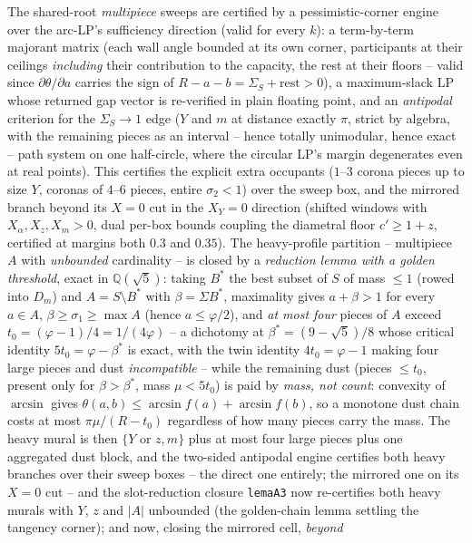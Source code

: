 \documentclass[11pt]{article}
\theoremstyle{definition}
\begin{document}
The shared-root \emph{multipiece} sweeps are certified by a
pessimistic-corner engine over the
arc-LP's sufficiency direction (valid for every $k$): a
term-by-term majorant matrix (each wall angle bounded at its own
corner, participants at their ceilings \emph{including} their
contribution to the capacity, the rest at their floors -- valid
since $\partial\theta/\partial a$ carries the sign of
$R-a-b=\Sigma_S+\text{rest}>0$), a maximum-slack LP whose returned
gap vector is re-verified in plain floating point, and an
\emph{antipodal} criterion for the $\Sigma_S\to1$ edge ($Y$ and $m$
at distance exactly $\pi$, strict by algebra, with the remaining
pieces as an interval -- hence totally unimodular, hence exact --
path system on one half-circle, where the circular LP's margin
degenerates even at real points). This certifies the explicit
extra occupants ($1$--$3$ corona pieces up to size $Y$, coronas of
$4$--$6$ pieces, entire $\sigma_2<1$) over the sweep box, and the
mirrored branch beyond its $X=0$ cut in the $X_Y=0$ direction
(shifted windows with $X_\alpha,X_z,X_m>0$, dual per-box bounds
coupling the diametral floor $c'\ge1+z$, certified at margins both
$0.3$ and $0.35$). The heavy-profile partition -- multipiece $A$
with \emph{unbounded} cardinality -- is closed by a
\emph{reduction lemma with a golden threshold}, exact in
$\mathbb{Q}(\sqrt5)$: taking $B^{*}$ the best subset of $S$ of mass
$\le1$ (rowed into $D_m$) and $A=S\setminus B^{*}$ with
$\beta=\Sigma B^{*}$, maximality gives $a+\beta>1$ for every
$a\in A$, $\beta\ge\sigma_1\ge\max A$ (hence $a\le\varphi/2$), and
\emph{at most four} pieces of $A$ exceed
$t_0=(\varphi-1)/4=1/(4\varphi)$ -- a dichotomy at
$\beta^{*}=(9-\sqrt5)/8$ whose critical identity
$5t_0=\varphi-\beta^{*}$ is exact, with the twin identity
$4t_0=\varphi-1$ making four large pieces and dust
\emph{incompatible} -- while the remaining dust (pieces $\le t_0$,
present only for $\beta>\beta^{*}$, mass $\mu<5t_0$) is paid by
\emph{mass, not count}: convexity of $\arcsin$ gives
$\theta(a,b)\le\arcsin f(a)+\arcsin f(b)$, so a monotone dust chain
costs at most $\pi\mu/(R-t_0)$ regardless of how many pieces carry
the mass. The heavy mural is then $\{Y\text{ or }z,m\}$ plus at
most four large pieces plus one aggregated dust block, and the
two-sided antipodal engine certifies both heavy branches over
their sweep boxes -- the direct one entirely; the mirrored one on
its $X=0$ cut -- and the slot-reduction closure \texttt{lemaA3}
now re-certifies both heavy murals with $Y$, $z$ and $|A|$
unbounded (the golden-chain lemma settling the tangency corner); and now, closing the mirrored cell, \emph{beyond}
\end{document}
